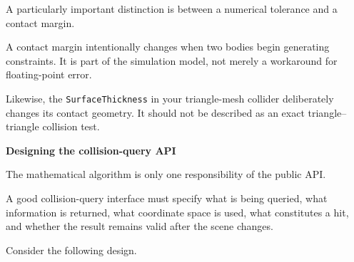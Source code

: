 A particularly important distinction is between a numerical tolerance and a contact margin.

A contact margin intentionally changes when two bodies begin generating constraints. It is part of the simulation model, not merely a workaround for floating-point error.

Likewise, the \texttt{SurfaceThickness} in your triangle-mesh collider deliberately changes its contact geometry. It should not be described as an exact triangle--triangle collision test.

\textbf{Designing the collision-query API}

The mathematical algorithm is only one responsibility of the public API.

A good collision-query interface must specify what is being queried, what information is returned, what coordinate space is used, what constitutes a hit, and whether the result remains valid after the scene changes.

Consider the following design.

